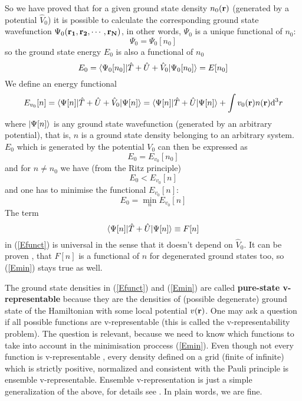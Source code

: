 So we have proved that for a given ground state density $n_0({\bf r})$ (generated by a potential $\hat V_0$) it is possible to calculate the corresponding ground state wavefunction $\Psi_0({\bf r_1},{\bf r_2},\cdots,{\bf r_N})$, in other words, $\Psi_0$ is a unique functional of $n_0$: 
\begin{equation*}
  \Psi_0=\Psi_0[n_0]
\end{equation*}
so the ground state energy $E_0$ is also a functional of $n_0$
\begin{equation*}
  E_0=\mathinner{\langle{\Psi_0[n_0]|\hat T+\hat U+\hat V_0|\Psi_0[n_0]}\rangle}=E[n_0]
\end{equation*}
We define an energy functional 
\begin{equation}
  E_{v_0}[n]=\mathinner{\langle{\Psi[n]|\hat T+\hat U+\hat V_0|\Psi[n]}\rangle}= \mathinner{\langle{\Psi[n]|\hat T+\hat U|\Psi[n]}\rangle}+\int v_0({\bf r})n({\bf r}){\rm d}^3r  \label{Efunct}
\end{equation}
where $\mathinner{|{\Psi[n]}\rangle}$ is any ground state wavefunction (generated by an arbitrary potential), that is, $n$ is a ground state density belonging to an arbitrary system. $E_0$ which is generated by the potential $V_0$ can then be expressed as 
\begin{equation*}
  E_0=E_{v_0}[n_0]
\end{equation*}
and for $n\neq n_0$ we have (from the Ritz principle) 
\begin{equation*}
  E_0<E_{v_0}[n]
\end{equation*}
and one has to minimise the functional $E_{v_0}[n]$: 
\begin{equation}
  E_0=\min_n E_{v_0}[n]  \label{Emin}
\end{equation}
The term 
\begin{equation*}
  \mathinner{\langle{\Psi[n]|\hat T+\hat U|\Psi[n]}\rangle}\equiv F[n]
\end{equation*}
in (\ref{Efunct}) is universal in the sense that it doesn't depend on $\hat V_0$. It can be proven \cite{DFT}, that $F[n]$ is a functional of $n$ for degenerated ground states too, so (\ref{Emin}) stays true as well.

The ground state densities in (\ref{Efunct}) and (\ref{Emin}) are called \textbf{pure-state v-representable} because they are the densities of (possible degenerate) ground state of the Hamiltonian with some local potential $v({\bf r})$. One may ask a question if all possible functions are v-representable (this is called the v-representability problem). The question is relevant, because we need to know which functions to take into account in the minimisation proccess (\ref{Emin}). Even though not every function is v-representable \cite{DFT}, every density defined on a grid (finite of infinite) which is strictly positive, normalized and consistent with the Pauli principle is ensemble v-representable. Ensemble v-representation is just a simple generalization of the above, for details see \cite{DFT}. In plain words, we are fine.

